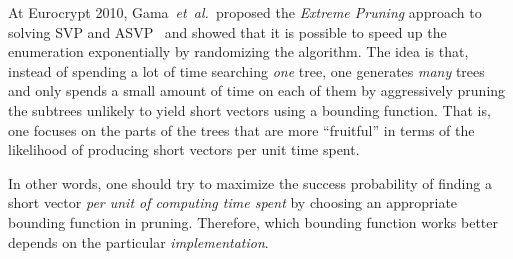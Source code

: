 \begin{CJK}{Bg5}{bsmi}
At Eurocrypt 2010, Gama~\emph{et~al.}\ proposed the \emph{Extreme
  Pruning} approach to solving SVP and ASVP~\cite{GamaNR10} and showed
that it is possible to speed up the enumeration exponentially by
randomizing the algorithm.
%
The idea is that, instead of spending a lot of time searching
\emph{one} tree, one generates \emph{many} trees and only spends a
small amount of time on each of them by aggressively pruning the
subtrees unlikely to yield short vectors using a bounding function.
%
That is, one focuses on the parts of the trees that are more
``fruitful'' in terms of the likelihood of producing short vectors per
unit time spent.

In other words, one should try to maximize the success probability of
finding a short vector \emph{per unit of computing time spent} by
choosing an appropriate bounding function in pruning.
%
Therefore, which bounding function works better depends on the
particular \emph{implementation}.

\begin{comment}
In this paper, we make a practical contribution on several fronts.
\begin{enumerate}
\item We use a polynomial bounding function, which performs better
  than the linear bounding function analyzed in Gama \emph{et
    al}.~\cite{GamaNR10}\ \
\item We recursively apply this brilliant idea of extreme pruning to
  BKZ so that we can quickly generate many bases of higher quality,
  which leads to better higher probability of finding short vectors
  than reported by Gama \emph{et al}.
\item We harness the immense computational power of graphic cards to
  speed up the computation.
\item Last but not least, we have run our code on Amazon's EC2, as
  such (A)SVP computations are seen to be easily adaptable to such
  cloud computing services.
\end{enumerate}
As a result, the ``cost'' of breaking a lattice-based cryptosystem can
henceforth be measured directly in U.S.\ dollars, taking Lenstra's
\emph{dollarday} metric~\cite{Lenstra2004KeyLength} to a next level.
%
That is, the cost will be shown literally as an amount on your
invoice, e.g., the effort in our solving a 114-dimensional instance of
the SVP challenge translating to a US\$400 bill from Amazon.
%
Moreover, this new metric is more practical in that the
parallelizability of the algorithm or the parallelization of the
implementation is \emph{explicitly} taken into account, as opposed to
being assumed or unspecified in the dollarday metric.
\end{comment}



\end{CJK}
